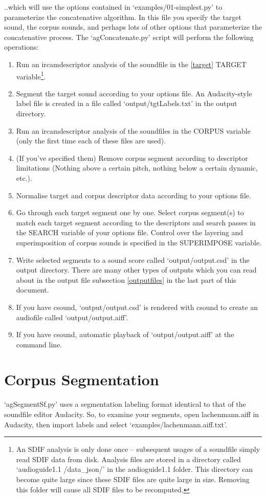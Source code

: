 \documentclass{article}
\newcommand{\ag}{audioguide1.1 }
\begin{document}
\begin{spacing}{1.2}
..which will use the options contained in `examples/01-simplest.py' to parameterize the concatenative algorithm.  In this file you specify the target sound, the corpus sounds, and perhaps lots of other options that parameterize the concatenative process.  The `agConcatenate.py' script will perform the following operations:
\begin{enumerate}
\item Run an ircamdescriptor analysis of the soundfile in the \ref{target} TARGET variable\footnote{An SDIF analysis is only done once -- subsequent usages of a soundfile simply read SDIF data from disk.  Analysis files are stored in a directory called `\ag/data\_json/' in the \ag folder.  This directory can become quite large since these SDIF files are quite large in size.  Removing this folder will cause all SDIF files to be recomputed.}.  
\item Segment the target sound according to your options file.  An Audacity-style label file is created in a file called `output/tgtLabels.txt' in the output directory.
\item Run an ircamdescriptor analysis of the soundfiles in the CORPUS variable (only the first time each of these files are used).
\item (If you've specified them) Remove corpus segment according to descriptor limitations (Nothing above a certain pitch, nothing below a certain dynamic, etc.).
\item Normalise target and corpus descriptor data according to your options file.
\item Go through each target segment one by one.  Select corpus segment(s) to match each target segment according to the descriptors and search passes in the SEARCH variable of your options file.  Control over the layering and superimposition of corpus sounds is specified in the SUPERIMPOSE variable.
\item Write selected segments to a sound score called `output/output.csd' in the output directory.  There are many other types of outputs which you can read about in the output file subsection \ref{outputfiles} in the last part of this document.
\item If you have csound, `output/output.csd' is rendered with csound to create an audiofile called `output/output.aiff'.
\item If you have csound, automatic playback of `output/output.aiff' at the command line.
\end{enumerate}


\section{Corpus Segmentation}
`agSegmentSf.py' uses a segmentation labeling format identical to that of the soundfile editor Audacity.  So, to examine your segments, open lachenmann.aiff in Audacity, then import labels and select `examples/lachenmann.aiff.txt'.


\end{spacing}
\end{document}
